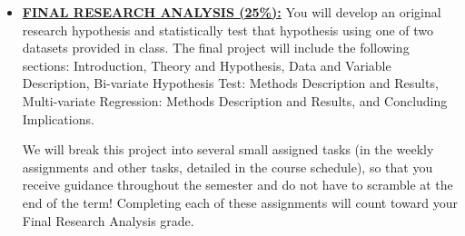 \documentclass[11pt]{article}
\begin{document}
\begin{itemize}

	\item \underline{\textbf{FINAL RESEARCH ANALYSIS (25\%):}} You will develop an original research hypothesis and statistically test that hypothesis using one of two datasets provided in class. The final project will include the following sections: Introduction, Theory and Hypothesis, Data and Variable Description, Bi-variate Hypothesis Test: Methods Description and Results, Multi-variate Regression: Methods Description and Results, and Concluding Implications. 
 
 We will break this project into several small assigned tasks (in the weekly assignments and other tasks, detailed in the course schedule), so that you receive guidance throughout the semester and do not have to scramble at the end of the term! Completing each of these assignments will count toward your Final Research Analysis grade. 
 
 
\end{itemize}
\end{document}
